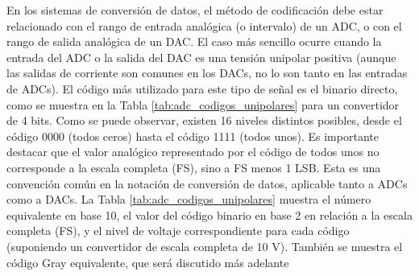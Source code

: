   
    En los sistemas de conversión de datos, el método de codificación debe estar relacionado con el rango de entrada analógica (o intervalo) de un ADC, o con el rango de salida analógica de un DAC. El caso más sencillo ocurre cuando la entrada del ADC o la salida del DAC es una tensión unipolar positiva (aunque las salidas de corriente son comunes en los DACs, no lo son tanto en las entradas de ADCs). El código más utilizado para este tipo de señal es el binario directo, como se muestra en la Tabla \ref{tab:adc_codigos_unipolares} para un convertidor de 4 bits. Como se puede observar, existen 16 niveles distintos posibles, desde el código 0000 (todos ceros) hasta el código 1111 (todos unos). Es importante destacar que el valor analógico representado por el código de todos unos no corresponde a la escala completa (FS), sino a FS menos 1 LSB. Esta es una convención común en la notación de conversión de datos, aplicable tanto a ADCs como a DACs. La Tabla \ref{tab:adc_codigos_unipolares} muestra el número equivalente en base 10, el valor del código binario en base 2 en relación a la escala completa (FS), y el nivel de voltaje correspondiente para cada código (suponiendo un convertidor de escala completa de 10 V). También se muestra el código Gray equivalente, que será discutido más adelante

